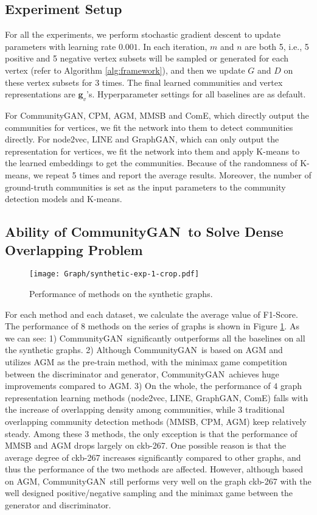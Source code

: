 \documentclass[sigconf]{acmart}
\newcommand{\ComGAN}{CommunityGAN}
\begin{document}
\subsection{Experiment Setup}
\label{subsec:experiment-setup}
For all the experiments, we perform stochastic gradient descent to update parameters with learning rate $0.001$.
In each iteration, $m$ and $n$ are both 5, i.e., 5 positive and 5 negative vertex subsets will be sampled or generated for each vertex (refer to Algorithm \ref{alg:framework}), and then we update $G$ and $D$ on these vertex subsets for 3 times.
The final learned communities and vertex representations are $\mathbf{g}_v$'s.
Hyperparameter settings for all baselines are as default.

For \ComGAN, CPM, AGM, MMSB and ComE, which directly output the communities for vertices, we fit the network into them to detect communities directly.
For node2vec, LINE and GraphGAN, which can only output the representation for vertices, we fit the network into them and apply K-means to the learned embeddings to get the communities.
Because of the randomness of K-means, we repeat 5 times and report the average results.
Moreover, the number of ground-truth communities is set as the input parameters to the community detection models and K-means.

\subsection{Ability of \ComGAN~to Solve Dense Overlapping Problem}

\begin{figure}[tbp]
\texttt{[image: Graph/synthetic-exp-1-crop.pdf]}
\caption{Performance of methods on the synthetic graphs.}
\label{fig:synthetic-data-1}
\end{figure}

For each method and each dataset, we calculate the average value of F1-Score.
The performance of $8$ methods on the series of graphs is shown in Figure \ref{fig:synthetic-data-1}.
As we can see: 
1) \ComGAN~significantly outperforms all the baselines on all the synthetic graphs.
2) Although \ComGAN~is based on AGM and utilizes AGM as the pre-train method, with the minimax game competition between the discriminator and generator, \ComGAN~achieves huge improvements compared to AGM.
3) On the whole, the performance of $4$ graph representation learning methods (node2vec, LINE, GraphGAN, ComE) falls with the increase of overlapping density among communities, while $3$ traditional overlapping community detection methods (MMSB, CPM, AGM) keep relatively steady.
Among these $3$ methods, the only exception is that the performance of MMSB and AGM drops largely on ckb-267.
One possible reason is that the average degree of ckb-267 increases significantly compared to other graphs, and thus the performance of the two methods are affected.
However, although based on AGM, \ComGAN~still performs very well on the graph ckb-267 with the well designed positive/negative sampling and the minimax game between the generator and discriminator.
\end{document}
